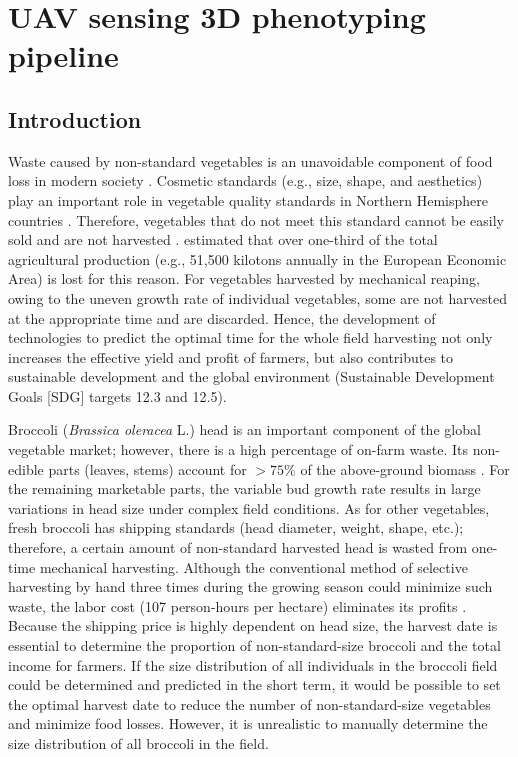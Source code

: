 \chapter{UAV sensing 3D phenotyping pipeline}

% 

\section{Introduction}

Waste caused by non-standard vegetables is an unavoidable component of food loss in modern society \citep{parfitt_food_2010,teuber_food_2016}. Cosmetic standards (e.g., size, shape, and aesthetics) play an important role in vegetable quality standards in Northern Hemisphere countries \citep{porter_avoidable_2018}. Therefore, vegetables that do not meet this standard cannot be easily sold and are not harvested \citep{garrone_opening_2014}. \citet{porter_avoidable_2018} estimated that over one-third of the total agricultural production (e.g., 51,500 kilotons annually in the European Economic Area) is lost for this reason. For vegetables harvested by mechanical reaping, owing to the uneven growth rate of individual vegetables, some are not harvested at the appropriate time and are discarded. Hence, the development of technologies to predict the optimal time for the whole field harvesting not only increases the effective yield and profit of farmers, but also contributes to sustainable development and the global environment (Sustainable Development Goals [SDG] targets 12.3 and 12.5).

Broccoli (\textit{Brassica oleracea} L.) head is an important component of the global vegetable market; however, there is a high percentage of on-farm waste. Its non-edible parts (leaves, stems) account for $> 75\%$ of the above-ground biomass \citep[Table~1]{fink_nitrogen_1999}. For the remaining marketable parts, the variable bud growth rate results in large variations in head size under complex field conditions. As for other vegetables, fresh broccoli has shipping standards (head diameter, weight, shape, etc.); therefore, a certain amount of non-standard harvested head is wasted from one-time mechanical harvesting. Although the conventional method of selective harvesting by hand three times during the growing season could minimize such waste, the labor cost (107 person-hours per hectare) eliminates its profits \citep{blok_effect_2021}. Because the shipping price is highly dependent on head size, the harvest date is essential to determine the proportion of non-standard-size broccoli and the total income for farmers. If the size distribution of all individuals in the broccoli field could be determined and predicted in the short term, it would be possible to set the optimal harvest date to reduce the number of non-standard-size vegetables and minimize food losses. However, it is unrealistic to manually determine the size distribution of all broccoli in the field.

